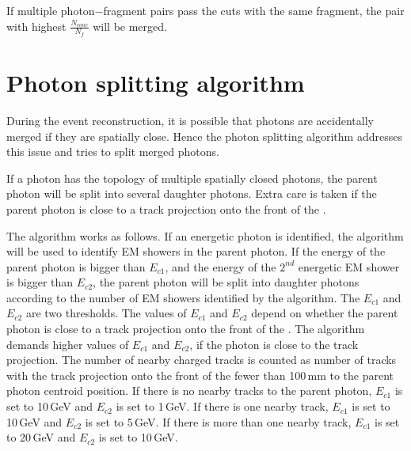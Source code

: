 If multiple photon$-$fragment pairs pass the cuts with the same fragment, the pair with highest $\frac{N_{cone}}{N_f}$ will be merged.



\section{Photon splitting algorithm}
\label{sec:photonSplitting}



During the event reconstruction, it is possible that photons are accidentally merged if they are spatially close. Hence the photon splitting  algorithm  addresses this issue and tries to split merged photons.

If a photon has the  topology of multiple spatially closed photons, the parent photon will be split into several daughter photons. Extra care is taken if the parent photon is close to a track projection onto the front of the \ECAL.

The algorithm works as follows. If an energetic photon is identified, the \peakFinding algorithm will  be used to identify EM showers in the parent photon. If the energy of the parent photon is bigger than $E_{c1}$, and the energy of the $2^{nd}$ energetic EM shower is bigger than $E_{c2}$, the parent photon will be split into daughter photons according to the number of EM showers identified by the \peakFinding algorithm. The  $E_{c1}$ and  $E_{c2}$ are two thresholds. The values of $E_{c1}$ and $E_{c2}$ depend on whether the parent photon is close to a track projection onto the front of the \ECAL. The algorithm demands  higher values of $E_{c1}$ and   $E_{c2}$, if the photon is close to the track projection. The number of nearby charged tracks is counted as number of tracks with the track projection onto the front of the \ECAL fewer than 100\,mm to the parent photon centroid position. If there is no nearby tracks to the parent photon, $E_{c1}$ is set to 10\,GeV and $E_{c2}$ is set to 1\,GeV. If there is one nearby track, $E_{c1}$ is set to 10\,GeV and $E_{c2}$ is set to 5\,GeV. If there is more than one nearby track, $E_{c1}$ is set to 20\,GeV and $E_{c2}$ is set to 10\,GeV.


